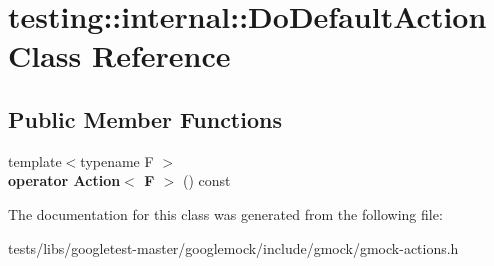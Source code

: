 \hypertarget{classtesting_1_1internal_1_1DoDefaultAction}{}\section{testing\+:\+:internal\+:\+:Do\+Default\+Action Class Reference}
\label{classtesting_1_1internal_1_1DoDefaultAction}
\subsection*{Public Member Functions}
\begin{DoxyCompactItemize}
\item 
\mbox{\label{classtesting_1_1internal_1_1DoDefaultAction_aea08828a0d64847e29ab7a5abeb74149}} 
{\footnotesize template$<$typename F $>$ }\\{\bfseries operator Action$<$ F $>$} () const
\end{DoxyCompactItemize}


The documentation for this class was generated from the following file\+:\begin{DoxyCompactItemize}
\item 
tests/libs/googletest-\/master/googlemock/include/gmock/gmock-\/actions.\+h\end{DoxyCompactItemize}
